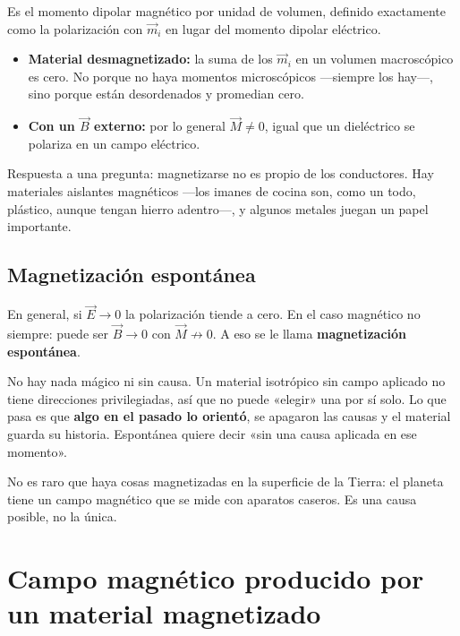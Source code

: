 \documentclass[12pt,a4paper]{article}
\begin{document}
Es el momento dipolar magnético por unidad de volumen, definido exactamente
como la polarización con $\vec m_i$ en lugar del momento dipolar eléctrico.

\begin{itemize}
  \item \textbf{Material desmagnetizado:} la suma de los $\vec m_i$ en un volumen
  macroscópico es cero. No porque no haya momentos microscópicos ---siempre los
  hay---, sino porque están desordenados y promedian cero.
  \item \textbf{Con un $\vec B$ externo:} por lo general $\vec M\neq0$, igual que un
  dieléctrico se polariza en un campo eléctrico.
\end{itemize}

\begin{notebox}
Respuesta a una pregunta: magnetizarse no es propio de los conductores. Hay
materiales aislantes magnéticos ---los imanes de cocina son, como un todo,
plástico, aunque tengan hierro adentro---, y algunos metales juegan un papel
importante.
\end{notebox}

\subsection{Magnetización espontánea}

En general, si $\vec E\to0$ la polarización tiende a cero. En el caso magnético
no siempre: puede ser $\vec B\to0$ con $\vec M\not\to0$. A eso se le llama
\textbf{magnetización espontánea}.

\begin{warnbox}
No hay nada mágico ni sin causa. Un
material isotrópico sin campo aplicado no tiene direcciones privilegiadas,
así que no puede «elegir» una por sí solo. Lo que pasa es que \textbf{algo en el
pasado lo orientó}, se apagaron las causas y el material guarda su historia.
Espontánea quiere decir «sin una causa aplicada en ese momento».
\end{warnbox}

No es raro que haya cosas magnetizadas en la superficie de la Tierra: el
planeta tiene un campo magnético que se mide con aparatos caseros. Es una causa
posible, no la única.

\section{Campo magnético producido por un material magnetizado}
\end{document}
